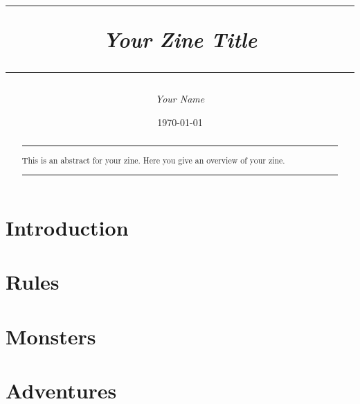 \documentclass[a4paper,14pt,twoside]{extarticle}
\title{\vspace{-3cm} \hrule \vspace{2mm} \textbf{\textit{Your Zine Title}} \vspace{2mm} \hrule}
\author{\textit{Your Name}}
\date{\today}
\begin{document}
\maketitle

\begin{abstract}
\hrule \vspace{2mm}
This is an abstract for your zine. Here you give an overview of your zine.
\vspace{2mm} \hrule
\end{abstract}

\begin{multicols}{2}

\section{Introduction}

\lipsum[1] %

\section{Rules}

\lipsum[2-4]

\section{Monsters}

\lipsum[5-7]

\section{Adventures}

\lipsum[8-10]

\end{multicols}
\end{document}
